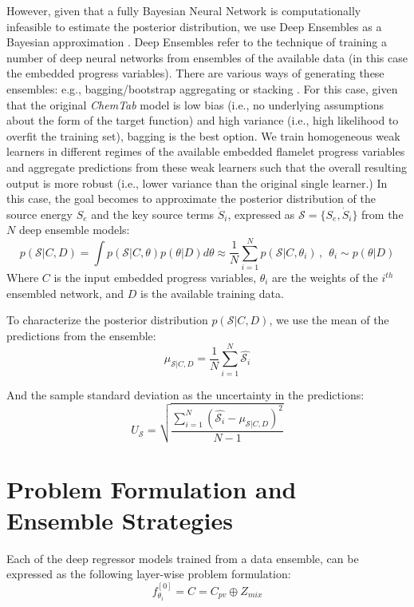 \documentclass[conf]{new-aiaa}
\begin{document}
However, given that a fully Bayesian Neural Network is computationally infeasible  \cite{https://doi.org/10.48550/arxiv.1910.06539} to estimate the posterior distribution, we use Deep Ensembles as a Bayesian approximation \cite{https://doi.org/10.48550/arxiv.1912.02757}. Deep Ensembles refer to the technique of training a number of deep neural networks from ensembles of the available data (in this case the embedded progress variables). There are various ways of generating these ensembles: e.g., bagging/bootstrap aggregating or stacking \cite{ensemblecite}. For this case, given that the original \textit{ChemTab} model is low bias (i.e., no underlying assumptions about the form of the target function) and high variance (i.e., high likelihood to overfit the training set), bagging is the best option. We train homogeneous weak learners in different regimes of the available embedded flamelet progress variables and aggregate predictions from these weak learners such that the overall resulting output is more robust (i.e., lower variance than the original single learner.) In this case, the goal becomes to approximate the posterior distribution of the source energy $S_e$ and the key source terms $\dot{S}_i$, expressed as $\mathcal{S}= \{S_e, \dot{S}_i \} $ from the $N$ deep ensemble models:
\begin{equation}
\label{sample:bayesapprox}
p(\mathcal{S} | C,D) = \int p(\mathcal{S}|C, \theta) p(\theta|D)d\theta \approx \frac{1}{N} \sum_{i=1}^{N} p(\mathcal{S}|C, \theta_i)\,, ~~\theta_i \sim p(\theta|D)
\end{equation}
Where $C$ is the input embedded progress variables, $\theta_i$ are the weights of the $i^{th}$ ensembled network, and $D$ is the available training data.


To characterize the posterior distribution $p(\mathcal{S}|C, D)$, we use the mean of the predictions from the ensemble:
\begin{equation}
\label{sample:posterior_ensemble}
\mu_{\mathcal{S}|C, D} = \frac{1}{N} \sum_{i = 1}^N \hat{\mathcal{S}_i}
\end{equation}

And the sample standard deviation as the uncertainty in the predictions:
\begin{equation}
U_\mathcal{S} =\sqrt{\frac{\sum_{i = 1}^N (\hat{\mathcal{S}_i} - \mu_{\mathcal{S}|C, D})^2}{N-1}}
\end{equation}



\section{Problem Formulation and Ensemble Strategies}
Each of the deep regressor models trained from a data ensemble, can be expressed as the following layer-wise problem formulation:
\begin{equation}
f_{\theta_i}^{[0]} = C = C_{pv} \oplus Z_{mix} 
\end{equation}
\end{document}
